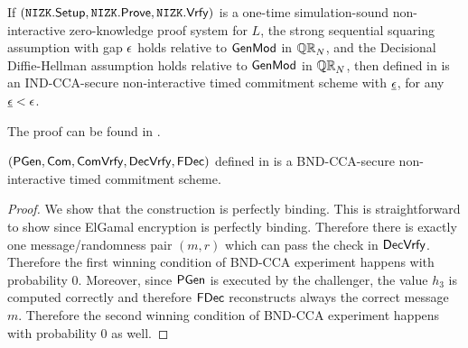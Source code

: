 %
%



\begin{theorem}
\label{thm:NITC-IND-Mul-Std}
If $(\mathtt{NIZK}.\mathsf{Setup}, \mathtt{NIZK}.\mathsf{Prove}, \mathtt{NIZK}.\mathsf{Vrfy})$ is a one-time simulation-sound non-interactive zero-knowledge proof system for $L$, the strong sequential squaring assumption with gap $\epsilon$ holds relative to $\mathsf{GenMod}$ in $\mathbb{QR}_N$, and the Decisional Diffie-Hellman assumption holds relative to $\mathsf{GenMod}$ in $\mathbb{QR}_N$, then \mathlist{(\pgen, \com, \cvrfy, \dvrfy, \fdecom)} defined in  is an IND-CCA-secure non-interactive timed commitment scheme with $\underline{\epsilon}$, for any $\underline{\epsilon} < \epsilon$. 
\end{theorem}


The proof can be found in .





\begin{theorem}\label{bnd-cca-mh}
$(\mathsf{PGen}, \mathsf{Com}, \mathsf{ComVrfy}, \mathsf{DecVrfy}, \mathsf{FDec})$ defined in  is a BND-CCA-secure non-interactive timed commitment scheme. 
\end{theorem}

\begin{proof}
We show that the construction is perfectly binding. This is straightforward to show since ElGamal encryption is perfectly binding. Therefore there is exactly one message/randomness pair $(m,r)$ which can pass the check in $\mathsf{DecVrfy}$. Therefore the first winning condition of BND-CCA experiment happens with probability 0. Moreover, since $\mathsf{PGen}$ is executed by the challenger, the value $h_3$ is computed correctly and therefore $\mathsf{FDec}$ reconstructs always the correct message $m$. Therefore the second winning condition of BND-CCA experiment happens with probability 0 as well.
\end{proof}

